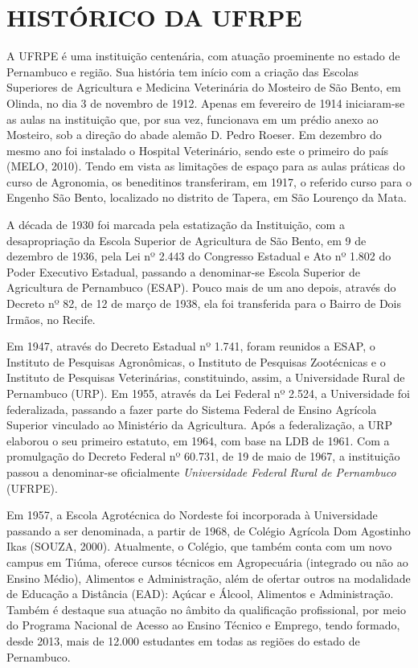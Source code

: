 \chapter{HISTÓRICO DA UFRPE}

A UFRPE é uma instituição centenária, com atuação proeminente no estado de Pernambuco e região. Sua história tem início com a criação das Escolas Superiores de Agricultura e Medicina Veterinária do Mosteiro de São Bento, em Olinda, no dia 3 de novembro de 1912. Apenas em fevereiro de 1914 iniciaram-se as aulas na instituição que, por sua vez, funcionava em um prédio anexo ao Mosteiro, sob a direção do abade alemão D. Pedro Roeser. Em dezembro do mesmo ano foi instalado o Hospital Veterinário, sendo este o primeiro do país (MELO, 2010). Tendo em vista as limitações de espaço para as aulas práticas do curso de Agronomia, os beneditinos transferiram, em 1917, o referido curso para o Engenho São Bento, localizado no distrito de Tapera, em São Lourenço da Mata.

A década de 1930 foi marcada pela estatização da Instituição, com a desapropriação da Escola Superior de Agricultura de São Bento, em 9 de dezembro de 1936, pela Lei nº 2.443 do Congresso Estadual e Ato nº 1.802 do Poder Executivo Estadual, passando a denominar-se Escola Superior de Agricultura de Pernambuco (ESAP). Pouco mais de um ano depois, através do Decreto nº 82, de 12 de março de 1938, ela foi transferida para o Bairro de Dois Irmãos, no Recife.

Em 1947, através do Decreto Estadual nº 1.741, foram reunidos a ESAP, o Instituto de Pesquisas Agronômicas, o Instituto de Pesquisas Zootécnicas e o Instituto de Pesquisas Veterinárias, constituindo, assim, a Universidade Rural de Pernambuco (URP). Em 1955, através da Lei Federal nº 2.524, a Universidade foi federalizada, passando a fazer parte do Sistema Federal de Ensino Agrícola Superior vinculado ao Ministério da Agricultura. Após a federalização, a URP elaborou o seu primeiro estatuto, em 1964, com base na LDB de 1961. Com a promulgação do Decreto Federal nº 60.731, de 19 de maio de 1967, a instituição passou a denominar-se oficialmente \textit{Universidade Federal Rural de Pernambuco} (UFRPE).

Em 1957, a Escola Agrotécnica do Nordeste foi incorporada à Universidade passando a ser denominada, a partir de 1968, de Colégio Agrícola Dom Agostinho Ikas (SOUZA, 2000). Atualmente, o Colégio, que também conta com um novo campus em Tiúma, oferece cursos técnicos em Agropecuária (integrado ou não ao Ensino Médio), Alimentos e Administração, além de ofertar outros na modalidade de Educação a Distância (EAD): Açúcar e Álcool, Alimentos e Administração. Também é destaque sua atuação no âmbito da qualificação profissional, por meio do Programa Nacional de Acesso ao Ensino Técnico e Emprego, tendo formado, desde 2013, mais de 12.000 estudantes em todas as regiões do estado de Pernambuco.


